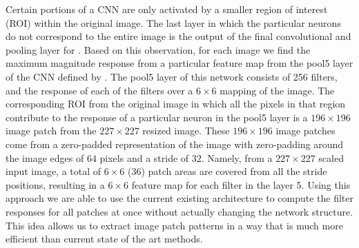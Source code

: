 \documentclass[10pt,twocolumn,letterpaper]{article}
\begin{document}
{%
Certain portions of a CNN are only activated by a smaller region of interest (ROI) within the original image.
The last layer in which the particular neurons do not correspond to the entire image is the output of the final convolutional and pooling layer for \cite{Alexnet}.
Based on this observation, for each image we find the maximum magnitude response from a particular feature map from the pool5 layer of the CNN defined by \cite{Alexnet}.
The pool5 layer of this network consists of 256 filters, and the response of each of the filters over a $6 \times 6$ mapping of the image.
The corresponding ROI from the original image in which all the pixels in that region contribute to the response of a particular neuron in the pool5 layer is a $196 \times 196$ image patch from the $227 \times 227$ resized image.
These $196 \times 196$ image patches come from a zero-padded representation of the image with zero-padding around the image edges of $64$ pixels and a stride of $32$.
Namely, from a $227 \times 227$ scaled input image, a total of $6 \times $6 (36) patch areas are covered from all the stride positions, resulting in a $6 \times 6$ feature map for each filter in the layer 5.
Using this approach we are able to use the current existing architecture to compute the filter responses for all patches at once without actually changing the network structure.
This idea allows us to extract image patch patterns in a way that is much more efficient than current state of the art methods.

}
\end{document}

